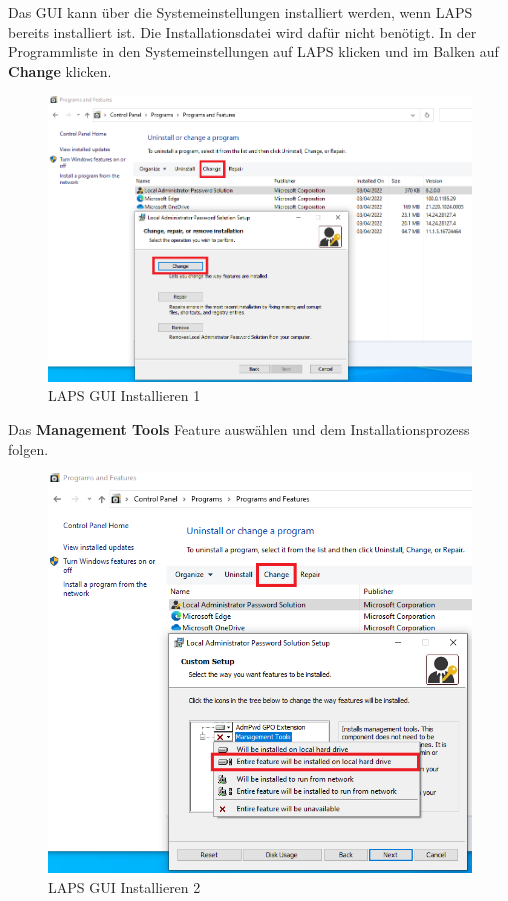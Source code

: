Das GUI kann über die Systemeinstellungen installiert werden, wenn LAPS bereits installiert ist.
Die Installationsdatei wird dafür nicht benötigt.
In der Programmliste in den Systemeinstellungen auf LAPS klicken und im Balken auf \textbf{Change} klicken.
\begin{figure}[H]
    \centering
    \includegraphics[width=0.7\linewidth]{../img/LAPS/laps-ui-install.png}
    \caption{LAPS GUI Installieren 1}
\end{figure}

Das \textbf{Management Tools} Feature auswählen und dem Installationsprozess folgen.
\begin{figure}[H]
    \centering
    \includegraphics[width=0.7\linewidth]{../img/LAPS/laps-ui-install-2.png}
    \caption{LAPS GUI Installieren 2}
\end{figure}


